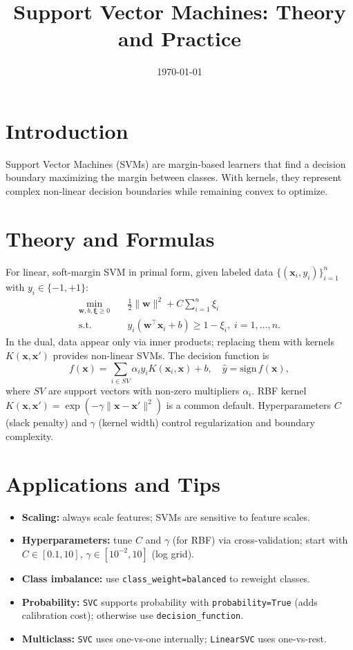 \documentclass[11pt]{article}
\title{Support Vector Machines: Theory and Practice}
\author{}
\date{\today}
\begin{document}
\maketitle

\section{Introduction}
Support Vector Machines (SVMs) are margin-based learners that find a decision boundary maximizing the margin between classes. With kernels, they represent complex non-linear decision boundaries while remaining convex to optimize.

\section{Theory and Formulas}
For linear, soft-margin SVM in primal form, given labeled data $\{(\mathbf{x}_i, y_i)\}_{i=1}^n$ with $y_i\in\{-1,+1\}$:
\begin{align}
\min_{\mathbf{w}, b, \boldsymbol{\xi} \ge 0} \quad & \tfrac{1}{2}\lVert \mathbf{w} \rVert^2 + C \sum_{i=1}^n \xi_i \\
\text{s.t.} \quad & y_i (\mathbf{w}^\top \mathbf{x}_i + b) \ge 1 - \xi_i, \; i=1,\dots,n.
\end{align}
In the dual, data appear only via inner products; replacing them with kernels $K(\mathbf{x},\mathbf{x}')$ provides non-linear SVMs. The decision function is
\begin{equation}
f(\mathbf{x}) = \sum_{i \in SV} \alpha_i y_i K(\mathbf{x}_i, \mathbf{x}) + b, \quad \hat{y} = \mathrm{sign}\, f(\mathbf{x}),
\end{equation}
where $SV$ are support vectors with non-zero multipliers $\alpha_i$. RBF kernel $K(\mathbf{x},\mathbf{x}') = \exp(-\gamma \lVert \mathbf{x}-\mathbf{x}'\rVert^2)$ is a common default. Hyperparameters $C$ (slack penalty) and $\gamma$ (kernel width) control regularization and boundary complexity.

\section{Applications and Tips}
\begin{itemize}
  \item \textbf{Scaling:} always scale features; SVMs are sensitive to feature scales.
  \item \textbf{Hyperparameters:} tune $C$ and $\gamma$ (for RBF) via cross-validation; start with $C\in[0.1,10]$, $\gamma\in[10^{-2},10]$ (log grid).
  \item \textbf{Class imbalance:} use \texttt{class\_weight=balanced} to reweight classes.
  \item \textbf{Probability:} \texttt{SVC} supports probability with \texttt{probability=True} (adds calibration cost); otherwise use \texttt{decision\_function}.
  \item \textbf{Multiclass:} \texttt{SVC} uses one-vs-one internally; \texttt{LinearSVC} uses one-vs-rest.
\end{itemize}
\end{document}
